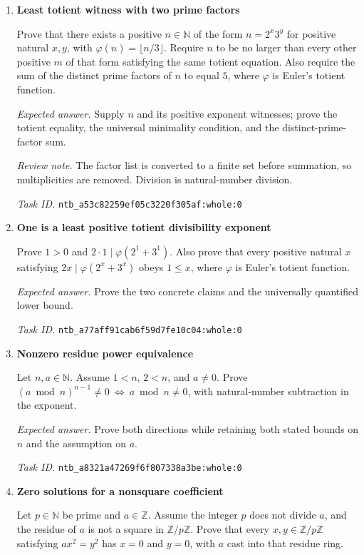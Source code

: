 \documentclass[11pt]{article}
\newcommand{\pth}[1]{\nolinkurl{#1}}
\begin{document}
\begin{enumerate}[label={TEST \arabic*.},leftmargin=4.5em,itemsep=1em]
\item \textbf{Least totient witness with two prime factors}\label{qn:test:54}

Prove that there exists a positive $n\in\mathbb N$ of the form $n=2^x3^y$ for positive natural $x,y$, with $\varphi(n)=\lfloor n/3\rfloor$. Require $n$ to be no larger than every other positive $m$ of that form satisfying the same totient equation. Also require the sum of the distinct prime factors of $n$ to equal $5$, where $\varphi$ is Euler's totient function.

\emph{Expected answer.} Supply $n$ and its positive exponent witnesses; prove the totient equality, the universal minimality condition, and the distinct-prime-factor sum.

\emph{Review note.} The factor list is converted to a finite set before summation, so multiplicities are removed. Division is natural-number division.

\emph{Task ID.} \pth{ntb_a53c82259ef05c3220f305af:whole:0}

\item \textbf{One is a least positive totient divisibility exponent}\label{qn:test:55}

Prove $1>0$ and $2\cdot1\mid\varphi(2^1+3^1)$. Also prove that every positive natural $x$ satisfying $2x\mid\varphi(2^x+3^x)$ obeys $1\le x$, where $\varphi$ is Euler's totient function.

\emph{Expected answer.} Prove the two concrete claims and the universally quantified lower bound.

\emph{Task ID.} \pth{ntb_a77aff91cab6f59d7fe10c04:whole:0}

\item \textbf{Nonzero residue power equivalence}\label{qn:test:56}

Let $n,a\in\mathbb N$. Assume $1<n$, $2<n$, and $a\ne0$. Prove $(a\bmod n)^{n-1}\ne0\ \Longleftrightarrow\ a\bmod n\ne0$, with natural-number subtraction in the exponent.

\emph{Expected answer.} Prove both directions while retaining both stated bounds on $n$ and the assumption on $a$.

\emph{Task ID.} \pth{ntb_a8321a47269f6f807338a3be:whole:0}

\item \textbf{Zero solutions for a nonsquare coefficient}\label{qn:test:57}

Let $p\in\mathbb N$ be prime and $a\in\mathbb Z$. Assume the integer $p$ does not divide $a$, and the residue of $a$ is not a square in $\mathbb Z/p\mathbb Z$. Prove that every $x,y\in\mathbb Z/p\mathbb Z$ satisfying $a x^2=y^2$ has $x=0$ and $y=0$, with $a$ cast into that residue ring.


\end{enumerate}
\end{document}
